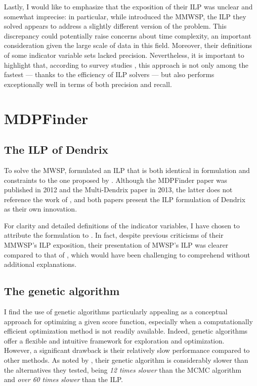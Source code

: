 Lastly, I would like to emphasize that the exposition of their ILP was unclear and somewhat imprecise: in particular, while \textcite{multi-dendrix} introduced the MMWSP, the ILP they solved appears to address a slightly different version of the problem. This discrepancy could potentially raise concerns about time complexity, an important consideration given the large scale of data in this field. Moreover, their definitions of some indicator variable sets lacked precision. Nevertheless, it is important to highlight that, according to survey studies \cite{survey}, this approach is not only among the fastest --- thanks to the efficiency of ILP solvers --- but also performs exceptionally well in terms of both precision and recall.

\section{MDPFinder}

\subsection{The ILP of Dendrix}

To solve the MWSP, \textcite{mdpfinder} formulated an ILP that is both identical in formulation and constraints to the one proposed by \textcite{multi-dendrix}. Although the MDPFinder paper was published in 2012 and the Multi-Dendrix paper in 2013, the latter does not reference the work of \textcite{mdpfinder}, and both papers present the ILP formulation of Dendrix as their own innovation.

For clarity and detailed definitions of the indicator variables, I have chosen to attribute the formulation to \textcite{multi-dendrix}. In fact, despite previous criticisms of their MMWSP's ILP exposition, their presentation of MWSP's ILP was clearer compared to that of \textcite{mdpfinder}, which would have been challenging to comprehend without additional explanations.

\subsection{The genetic algorithm}

I find the use of genetic algorithms particularly appealing as a conceptual approach for optimizing a given score function, especially when a computationally efficient optimization method is not readily available. Indeed, genetic algorithms offer a flexible and intuitive framework for exploration and optimization. However, a significant drawback is their relatively slow performance compared to other methods. As noted by \textcite{mdpfinder}, their genetic algorithm is considerably slower than the alternatives they tested, being \textit{12 times slower} than the MCMC algorithm and \textit{over 60 times slower} than the ILP.

